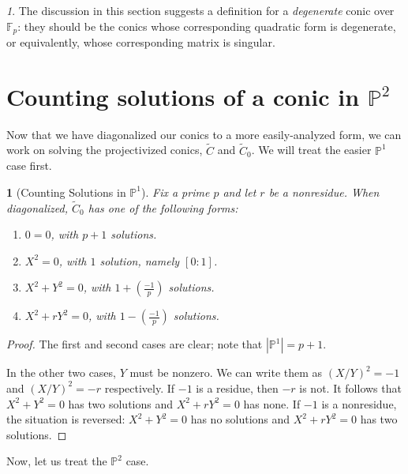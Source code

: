 \documentclass[10pt,a4paper]{amsart}
\numberwithin{equation}{section}
\numberwithin{figure}{section}
\numberwithin{table}{section}
\theoremstyle{definition}
\theoremstyle{plain}
\theoremstyle{remark}
\newtheorem*{rem*}{\protect\remarkname}
\theoremstyle{plain}
\theoremstyle{definition}
\theoremstyle{plain}
\newtheorem{prop}[thm]{\protect\propositionname}
\theoremstyle{plain}
\providecommand{\propositionname}{Proposition}
\providecommand{\remarkname}{Remark}
\newcommand{\legendre}[2]{\genfrac{(}{)}{}{}{#1}{#2}}
\renewcommand{\P}{\mathbb{P}}
\newcommand{\F}{\mathbb{F}}
\begin{document}
	\begin{rem*}
		The discussion in this section suggests a definition for a \emph{degenerate} conic over $\F_p$: they should be the conics whose corresponding quadratic form is degenerate, or equivalently, whose corresponding matrix is singular.
	\end{rem*}
	
	\section{Counting solutions of a conic in $\P^2$}
	\label{sec:proj-solutions}
	
	Now that we have diagonalized our conics to a more easily-analyzed form, we can
	work on solving the projectivized conics, $\widetilde{C}$ and 
	$\widetilde{C}_0$. We will treat the easier $\P^1$ case first.
	\begin{prop}[Counting Solutions in $\P^1$]
		\label{prop:counting-P1-solutions}
		Fix a prime $p$ and let $r$ be a nonresidue. When diagonalized,
		$\widetilde{C}_0$ has one of the following forms:
		\begin{enumerate}
			\item \label{case:0} $0 = 0$, with $p+1$ solutions.
			\item $X^2 = 0$, with $1$ solution, namely $[0:1]$.
			\item \label{case:x^2+y^2=0} $X^2 + Y^2 = 0$, with 
			$1 + \legendre{-1}{p}$ solutions.
			\item $X^2 + rY^2 = 0$, with 
			$1 - \legendre{-1}{p}$ solutions.
		\end{enumerate}    
	\end{prop}
	\begin{proof}
		The first and second cases are clear; note that $|\P^1| = p+1$.
		
		In the other two cases, $Y$ must be nonzero. We can write them as
		$(X/Y)^2 = -1$ and $(X/Y)^2 = -r$ respectively. If $-1$ is a residue,
		then $-r$ is not. It follows that $X^2 + Y^2 = 0$ has two solutions and $X^2 +
		rY^2 = 0$ has none. If $-1$ is a nonresidue, the situation is reversed: $X^2 +
		Y^2 = 0$ has no solutions and $X^2 + rY^2 = 0$ has two solutions.
	\end{proof}
	
	Now, let us treat the $\P^2$ case.
	
\end{document}
